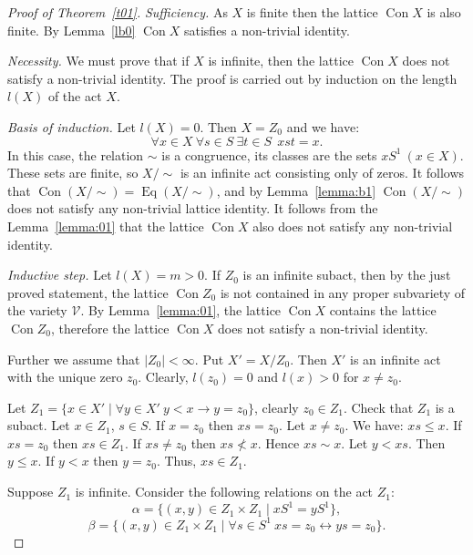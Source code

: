 \documentclass{birkau}
\numberwithin{equation}{section}
\theoremstyle{plain}
\theoremstyle{definition}
\DeclareMathOperator{\Con}{Con}
\DeclareMathOperator{\Eq}{Eq}
\begin{document}
	\begin{proof}[Proof of Theorem~\ref{t01}]
	    \textit{Sufficiency.} As $X$ is finite then the lattice $\Con X$ is also finite. By Lemma~\ref{lb0} $\Con X$ satisfies a non-trivial identity.
	
		\textit{Necessity.} We must prove that if $X$ is infinite, then the lattice $\Con X$ does not satisfy a non-trivial identity. The proof is carried out by induction on the length $l(X)$ of the act $X$.
		
		\textit{Basis of induction.} Let $l(X) = 0$. Then $X = Z_0$ and we have: $$ \forall x \in X \ \forall s \in S \ \exists t \in S \ \ xst = x. $$ In this case, the relation $\sim$ is a congruence, its classes are the sets $xS^1\ (x \in X)$. These sets are finite, so ${X}/{\sim}$ is an infinite act consisting only of zeros. It follows that $\Con({X}/{\sim})=\Eq({X}/{\sim})$, and by Lemma~\ref{lemma:b1} $\Con({X}/{\sim})$ does not satisfy any non-trivial lattice identity. It follows from the Lemma~\ref{lemma:01} that the lattice $\Con X$ also does not satisfy any non-trivial identity.
		
		\textit{Inductive step.} Let $l(X) = m > 0$. If $Z_0$ is an infinite subact, then by the just proved statement, the lattice $\Con Z_0$ is not contained in any proper subvariety of the variety $\mathcal{V}$. By Lemma~\ref{lemma:01}, the lattice $\Con X$ contains the lattice $\Con Z_0$, therefore the lattice $\Con X$ does not satisfy a non-trivial identity.
		
		Further we assume that $|Z_0| < \infty$. Put $X'={X}/{Z_0}$. Then $X'$ is an infinite act with the unique zero $z_0$. Clearly,  $l(z_0) = 0$ and $l(x) > 0$ for $x \neq z_0$.
		
		Let $Z_1 = \{x \in X' \mid \forall y  \in X' \ y < x \rightarrow y = z_0\}$, clearly $z_0 \in Z_1$. Check that $Z_1$ is a subact. Let $x \in Z_1$, $s \in S$. If $x = z_0$ then $xs = z_0$. Let $x \neq z_0$. We have: $xs \leqslant x$. If $xs = z_0$ then $xs \in Z_1$. If $xs \neq z_0$ then $xs \not < x$. Hence $xs \sim x$. Let $y < xs$. Then $y \leqslant x$. If $y < x$ then $y = z_0$. Thus, $xs \in Z_1$.
		
		Suppose $ Z_1 $ is infinite. Consider the following relations on the act $Z_1$: $$ \alpha = \{ (x,y) \in Z_1 \times Z_1 \mid xS^1 = yS^1 \}, $$ $$ \beta = \{ (x,y) \in Z_1 \times Z_1 \mid \forall s \in S^1 \ xs = z_0 \leftrightarrow ys = z_0 \}. $$
		

\end{proof}
\end{document}
